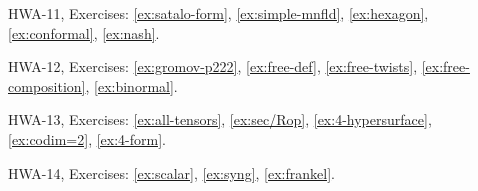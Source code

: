 HWA-11, Exercises: 
\ref{ex:satalo-form}, 
\ref{ex:simple-mnfld}, 
\ref{ex:hexagon}, 
\ref{ex:conformal},
\ref{ex:nash}.

HWA-12, Exercises: 
\ref{ex:gromov-p222},
\ref{ex:free-def},
\ref{ex:free-twists},
\ref{ex:free-composition},
\ref{ex:binormal}.

HWA-13, Exercises: 
\ref{ex:all-tensors},
\ref{ex:sec/Rop},
\ref{ex:4-hypersurface},
\ref{ex:codim=2},
\ref{ex:4-form}.

HWA-14, Exercises: 
\ref{ex:scalar},
\ref{ex:syng},
\ref{ex:frankel}.
